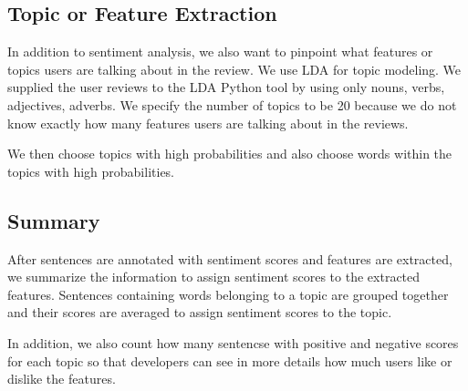 \subsection{Topic or Feature Extraction}
In addition to sentiment analysis, we also want to pinpoint what features or topics users are talking about in the review. We use LDA for topic modeling. We supplied the user reviews to the LDA Python tool by using only nouns, verbs, adjectives, adverbs. We specify the number of topics to be 20 because we do not know exactly how many features users are talking about in the reviews.

We then choose topics with high probabilities and also choose words within the topics with high probabilities.


\subsection{Summary}
After sentences are annotated with sentiment scores and features are extracted, we summarize the information to assign sentiment scores to the extracted features. Sentences containing words belonging to a topic are grouped together and their scores are averaged to assign sentiment scores to the topic. 

In addition, we also count how many sentencse with positive and negative scores for each topic so that developers can see in more details how much users like or dislike the features. 





